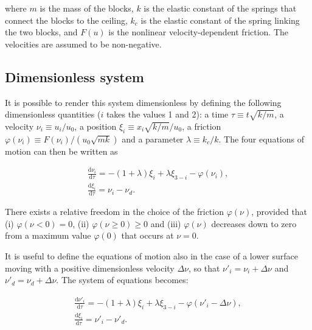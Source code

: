 where $m$ is the mass of the blocks, $k$ is the elastic constant of the springs that connect the blocks
to the ceiling, $k_c$ is the elastic constant of the spring linking the two blocks, and $F(u)$ is the nonlinear
velocity-dependent friction. The velocities are assumed to be non-negative.

\subsection{Dimensionless system}
\label{subsec: dimensionless 2 block motion}

It is possible to render this system dimensionless by defining the following dimensionless quantities ($i$ takes the values 1 and 2):
a time $\tau\equiv t\sqrt{k/m}$, a velocity $\nu_i\equiv u_i/u_0$, a position $\xi_i\equiv x_i \sqrt{k/m}/u_0$,
a friction $\varphi(\nu_i)\equiv F(\nu_i)/(u_0\sqrt{mk})$ and a parameter $\lambda\equiv k_c/k$.
The four equations of motion can then be written as

\begin{equation}
\label{eq: 2 block motion dimensionless}
\begin{gathered}
    \frac{\text{d}\nu_i}{\text{d}\tau}=-(1+\lambda)\xi_i+\lambda\xi_{3-i}-\varphi(\nu_i),\\[10pt]
    \frac{\text{d}\xi_i}{\text{d}\tau}=\nu_i-\nu_d.
\end{gathered}
\end{equation}

There exists a relative freedom in the choice of the friction $\varphi(\nu)$, provided that
(i) $\varphi(\nu<0)=0$, (ii) $\varphi(\nu\geq0)\geq0$ and (iii) $\varphi(\nu)$ decreases down to zero from a
maximum value $\varphi(0)$ that occurs at $\nu=0$.

It is useful to define the equations of motion also in the case of a lower surface moving with a positive
dimensionless velocity $\Delta\nu$, so that $\nu'_i=\nu_i+\Delta\nu$ and $\nu'_d=\nu_d+\Delta\nu$.
The system of equations becomes:

\begin{equation}
    \label{eq: 2 block motion dimensionless moving surface}
    \begin{gathered}
        \frac{\text{d}\nu'_i}{\text{d}\tau}=-(1+\lambda)\xi_i+\lambda\xi_{3-i}-\varphi(\nu'_i-\Delta\nu),\\[10pt]
        \frac{\text{d}\xi_i}{\text{d}\tau}=\nu'_i-\nu'_d.
    \end{gathered}
\end{equation}


